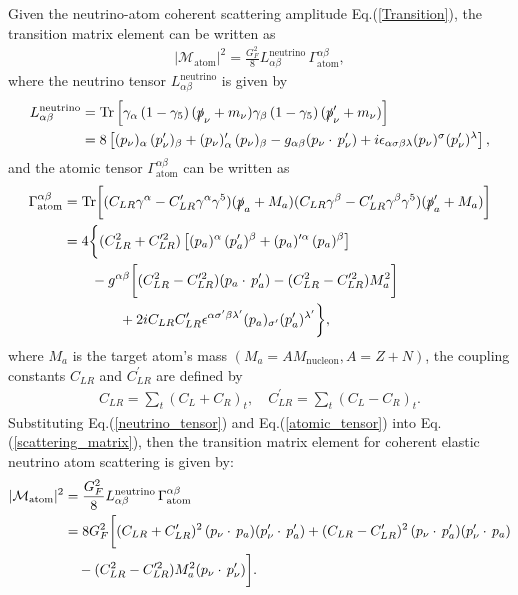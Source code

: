 Given the neutrino-atom coherent scattering amplitude Eq.(\ref{Transition}), the transition matrix element can be written as
\begin{align}
\label{scattering_matrix}
|\mathcal{M}_{\mathrm{atom}}|^2=\frac{G^2_F}{8}L_{\alpha\beta}^{\mathrm{neutrino}}\,\Gamma^{\alpha\beta}_{\mathrm{atom}},
\end{align}
where the neutrino tensor $L_{\alpha\beta}^{\mathrm{neutrino}}$ is given by
\begin{align}
\label{neutrino_tensor}
L_{\alpha\beta}^{\mathrm{neutrino}}
&=\mathrm{Tr}\left[\gamma_\alpha\left(1-\gamma_5\right)(\slashed{p}_\nu+m_\nu)\gamma_\beta\left(1-\gamma_5\right)(\slashed{p}^\prime_\nu+m_\nu)\right]\notag\\
&=8\left[(p_\nu)_\alpha\,(p^\prime_{\nu})_\beta+(p_\nu)^\prime_\alpha\,(p_\nu)_\beta-g_{\alpha\beta}(p_\nu\cdot\,p_\nu^\prime)+i\epsilon_{\alpha\sigma\beta\lambda}(p_\nu)^\sigma(p^\prime_\nu)^\lambda\right],
\end{align}
and the atomic tensor $\Gamma^{\alpha\beta}_\mathrm{atom}$ can be written as
\begin{align}
\label{atomic_tensor}
\Gamma^{\alpha\beta}_\mathrm{atom}
&=\mathrm{Tr}\bigg[(C_{LR}\gamma^\alpha-C^\prime_{LR}\gamma^\alpha\gamma^5)(\slashed{p}_a+M_a)(C_{LR}\gamma^\beta-C^\prime_{LR}\gamma^\beta\gamma^5)(\slashed{p}^\prime_a+M_a)\bigg]\notag\\
&=4\bigg\{(C^2_{LR}+C^{\prime2}_{LR})\left[(p_a)^\alpha\,(p^\prime_a)^\beta+(p_a)^{\prime\alpha}\,(p_a)^\beta\right]\notag\\
&\qquad-g^{\alpha\beta}\bigg[(C^2_{LR}-C^{\prime2}_{LR})(p_a\cdot\,p_a^\prime)-(C^2_{LR}-C^{\prime2}_{LR})M^2_a\bigg]\notag\\&\qquad\qquad+2iC_{LR}C^\prime_{LR}\epsilon^{\alpha\sigma^\prime\beta\lambda^\prime}(p_a)_{\sigma^\prime}(p^\prime_a)^{\lambda^\prime}\bigg\},
\end{align}
where $M_a$ is the target atom's mass $(M_a = AM_\mathrm{nucleon}, A=Z+N)$, the coupling constants $C_{LR}$ and $C^\prime_{LR}$ are defined by
\begin{align}
C_{LR}=\sum_t(C_L+C_R)_t,\,\,\,\,\,\,C^\prime_{LR}=\sum_t(C_L-C_R)_t.
\end{align}
Substituting Eq.(\ref{neutrino_tensor}) and Eq.(\ref{atomic_tensor}) into Eq.(\ref{scattering_matrix}), then the transition matrix element for coherent elastic neutrino atom scattering is given by:
\begin{align}
|\mathcal{M}_{\mathrm{atom}}|^2&=\frac{G^2_F}{8}L_{\alpha\beta}^{\mathrm{neutrino}}\,\Gamma^{\alpha\beta}_{\mathrm{atom}}\notag\\
&=8G^2_F\bigg[(C_{LR}+C^\prime_{LR})^2\,(p_\nu\cdot\,p_a)(p^\prime_\nu\cdot\,p^\prime_a)+(C_{LR}-C^\prime_{LR})^2\,(p_\nu\cdot\,p^\prime_a)(p^\prime_\nu\cdot\,p_a)\notag\\&
\,\,\,\,\,\,-(C^2_{LR}-C^{\prime2}_{LR})M^2_a(p_\nu\cdot\,p_\nu^\prime)\bigg].
\end{align}
